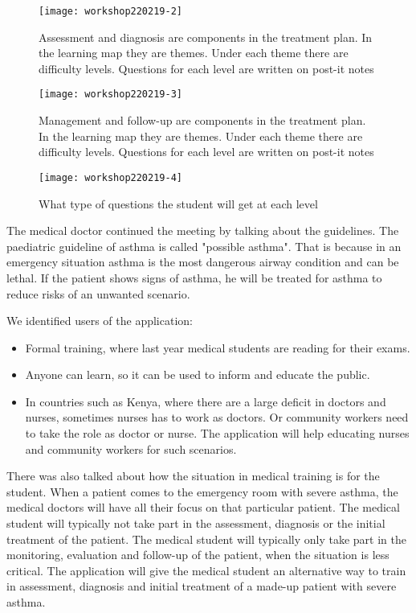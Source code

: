 \begin{figure}[h!]
	\texttt{[image: workshop220219-2]}
	\caption {Assessment and diagnosis are components in the treatment plan. In the learning map they are themes. Under each theme there are difficulty levels. Questions for each level are written on post-it notes}
\end{figure}

\begin{figure}[h!]
	\texttt{[image: workshop220219-3]}
	\caption {Management and follow-up are components in the treatment plan. In the learning map they are themes. Under each theme there are difficulty levels. Questions for each level are written on post-it notes}
\end{figure}

\begin{figure}[h!]
	\texttt{[image: workshop220219-4]}
	\caption {What type of questions the student will get at each level}
\end{figure}

The medical doctor continued the meeting by talking about the guidelines. The paediatric guideline of asthma is called "possible asthma". That is because in an emergency situation asthma is the most dangerous airway condition and can be lethal. If the patient shows signs of asthma, he will be treated for asthma to reduce risks of an unwanted scenario.

We identified users of the application: 
\begin{itemize}
	\item Formal training, where last year medical students are reading for their exams.
	\item Anyone can learn, so it can be used to inform and educate the public.
	\item In countries such as Kenya, where there are a large deficit in doctors and nurses, sometimes nurses has to work as doctors. Or community workers need to take the role as doctor or nurse. The application will help educating nurses and community workers for such scenarios.
\end{itemize}
 
 There was also talked about how the situation in medical training is for the student. When a patient comes to the emergency room with severe asthma, the medical doctors will have all their focus on that particular patient. The medical student will typically not take part in the assessment, diagnosis or the initial treatment of the patient. The medical student will typically only take part in the monitoring, evaluation and follow-up of the patient, when the situation is less critical. The application will give the medical student an alternative way to train in assessment, diagnosis and initial treatment of a made-up patient with severe asthma. 

